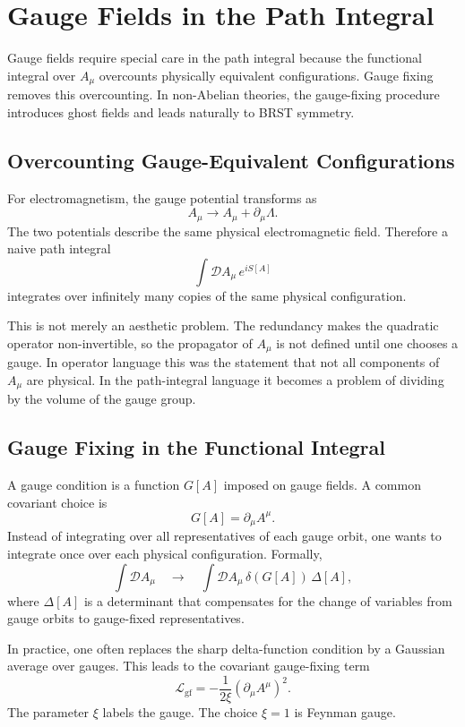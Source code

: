 \chapter{Gauge Fields in the Path Integral}

\begin{remarkbox}
Gauge fields require special care in the path integral because the functional
integral over \(A_\mu\) overcounts physically equivalent configurations. Gauge
fixing removes this overcounting. In non-Abelian theories, the gauge-fixing
procedure introduces ghost fields and leads naturally to BRST symmetry.
\end{remarkbox}

\section{Overcounting Gauge-Equivalent Configurations}

For electromagnetism, the gauge potential transforms as
\[
    A_\mu\longrightarrow A_\mu+\partial_\mu\Lambda.
\]
The two potentials describe the same physical electromagnetic field. Therefore a
naive path integral
\[
    \int\mathcal{D}A_\mu\,e^{iS[A]}
\]
integrates over infinitely many copies of the same physical configuration.

This is not merely an aesthetic problem. The redundancy makes the quadratic
operator non-invertible, so the propagator of \(A_\mu\) is not defined until one
chooses a gauge. In operator language this was the statement that not all
components of \(A_\mu\) are physical. In the path-integral language it becomes a
problem of dividing by the volume of the gauge group.

\section{Gauge Fixing in the Functional Integral}

A gauge condition is a function \(G[A]\) imposed on gauge fields. A common
covariant choice is
\[
    G[A]=\partial_\mu A^\mu.
\]
Instead of integrating over all representatives of each gauge orbit, one wants
to integrate once over each physical configuration. Formally,
\[
    \int\mathcal{D}A_\mu
    \quad\longrightarrow\quad
    \int\mathcal{D}A_\mu\,\delta(G[A])\,\Delta[A],
\]
where \(\Delta[A]\) is a determinant that compensates for the change of
variables from gauge orbits to gauge-fixed representatives.

In practice, one often replaces the sharp delta-function condition by a Gaussian
average over gauges. This leads to the covariant gauge-fixing term
\[
    \mathcal{L}_{\mathrm{gf}}
    = -\frac{1}{2\xi}(\partial_\mu A^\mu)^2.
\]
The parameter \(\xi\) labels the gauge. The choice \(\xi=1\) is Feynman gauge.

